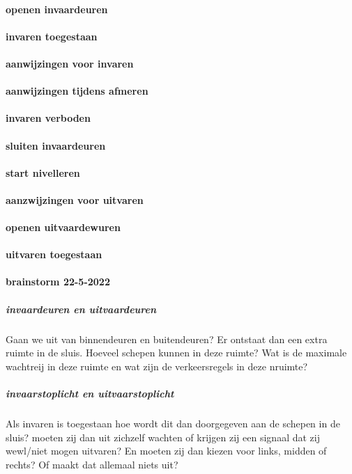 \paragraph{openen invaardeuren}




\paragraph{invaren toegestaan}

\paragraph{aanwijzingen voor invaren}
\paragraph{aanwijzingen tijdens afmeren}

\paragraph{invaren verboden}

\paragraph{sluiten invaardeuren}

\paragraph{start nivelleren}

\paragraph{aanzwijzingen voor uitvaren}
\paragraph{openen uitvaardewuren}

\paragraph{uitvaren toegestaan}




\paragraph{brainstorm 22-5-2022}

\subparagraph{invaardeuren en uitvaardeuren}
Gaan we uit van binnendeuren en buitendeuren? Er ontstaat dan een extra ruimte in de sluis. Hoeveel schepen kunnen in deze ruimte? Wat is de maximale wachtreij in deze ruimte en wat zijn de verkeersregels in deze nruimte?
\subparagraph{invaarstoplicht en uitvaarstoplicht}
Als invaren is toegestaan hoe wordt dit dan doorgegeven aan de schepen in de sluis? moeten zij dan uit zichzelf wachten of krijgen zij een signaal dat zij wewl/niet mogen uitvaren? En moeten zij dan kiezen voor links, midden of rechts? Of maakt dat allemaal niets uit?

